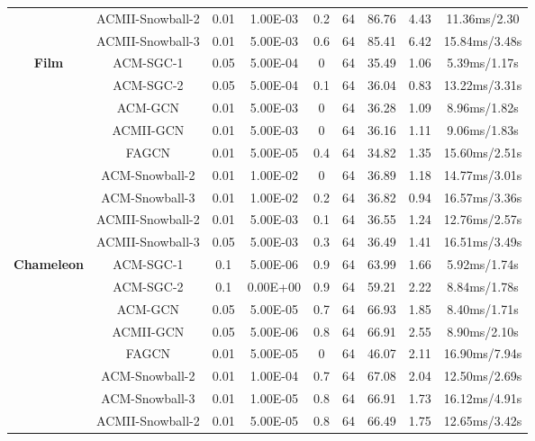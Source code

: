 \documentclass{article}
\newcommand{\0}{{\boldsymbol{0}}}
\newcommand{\6}{{\partial}}
\newcommand{\8}{{\infty}}
\newcommand{\4}{{\nabla}}
\begin{document}
\begin{table}[htbp]
{\begin{tabular}{c|c|ccccccc}
          & ACMII-Snowball-2 & 0.01  & 1.00E-03 & 0.2   & 64    & 86.76 & 4.43  & 11.36ms/2.30 \\
          & ACMII-Snowball-3 & 0.01  & 5.00E-03 & 0.6   & 64    & 85.41 & 6.42  & 15.84ms/3.48s \\
           \midrule
    \multirow{9}[0]{*}{\textbf{Film}} & ACM-SGC-1 & 0.05  & 5.00E-04 & 0     & 64    & 35.49 & 1.06  & 5.39ms/1.17s \\
          & ACM-SGC-2 & 0.05  & 5.00E-04 & 0.1   & 64    & 36.04 & 0.83  & 13.22ms/3.31s \\
          & ACM-GCN & 0.01  & 5.00E-03 & 0     & 64    & 36.28 & 1.09  & 8.96ms/1.82s \\
          & ACMII-GCN & 0.01  & 5.00E-03 & 0     & 64    & 36.16 & 1.11  & 9.06ms/1.83s \\
          & FAGCN & 0.01  & 5.00E-05 & 0.4   & 64    & 34.82 & 1.35  & 15.60ms/2.51s \\
          & ACM-Snowball-2 & 0.01  & 1.00E-02 & 0     & 64    & 36.89 & 1.18  & 14.77ms/3.01s \\
          & ACM-Snowball-3 & 0.01  & 1.00E-02 & 0.2   & 64    & 36.82 & 0.94  & 16.57ms/3.36s \\
          & ACMII-Snowball-2 & 0.01  & 5.00E-03 & 0.1   & 64    & 36.55 & 1.24  & 12.76ms/2.57s \\
          & ACMII-Snowball-3 & 0.05  & 5.00E-03 & 0.3   & 64    & 36.49 & 1.41  & 16.51ms/3.49s \\
           \midrule
    \multirow{9}[0]{*}{\textbf{Chameleon}} & ACM-SGC-1 & 0.1   & 5.00E-06 & 0.9   & 64    & 63.99 & 1.66  & 5.92ms/1.74s \\
          & ACM-SGC-2 & 0.1   & 0.00E+00 & 0.9   & 64    & 59.21 & 2.22  & 8.84ms/1.78s \\
          & ACM-GCN & 0.05  & 5.00E-05 & 0.7   & 64    & 66.93 & 1.85  & 8.40ms/1.71s \\
          & ACMII-GCN & 0.05  & 5.00E-06 & 0.8   & 64    & 66.91 & 2.55  & 8.90ms/2.10s \\
          & FAGCN & 0.01  & 5.00E-05 & 0     & 64    & 46.07 & 2.11  & 16.90ms/7.94s \\
          & ACM-Snowball-2 & 0.01  & 1.00E-04 & 0.7   & 64    & 67.08 & 2.04  & 12.50ms/2.69s \\
          & ACM-Snowball-3 & 0.01  & 1.00E-05 & 0.8   & 64    & 66.91 & 1.73  & 16.12ms/4.91s \\
          & ACMII-Snowball-2 & 0.01  & 5.00E-05 & 0.8   & 64    & 66.49 & 1.75  & 12.65ms/3.42s \\

\end{tabular}}
\end{table}
\end{document}
